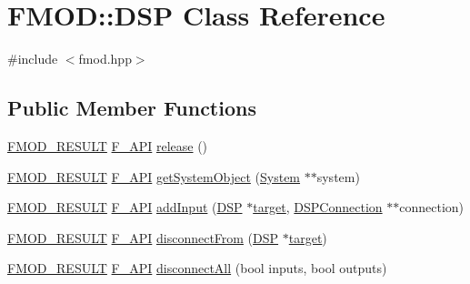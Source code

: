 \hypertarget{class_f_m_o_d_1_1_d_s_p}{\section{F\-M\-O\-D\-:\-:D\-S\-P Class Reference}
\label{class_f_m_o_d_1_1_d_s_p}
}


{\ttfamily \#include $<$fmod.\-hpp$>$}

\subsection*{Public Member Functions}
\begin{DoxyCompactItemize}
\item 
\hyperlink{fmod_8h_ae6ddadf8cb315e93ae7e6456b19db276}{F\-M\-O\-D\-\_\-\-R\-E\-S\-U\-L\-T} \hyperlink{fmod_8h_ace803d13e798b0cdde4384f9f323b901}{F\-\_\-\-A\-P\-I} \hyperlink{class_f_m_o_d_1_1_d_s_p_a4ffd9dbcf1b0119a2ab94d27744ee033}{release} ()
\item 
\hyperlink{fmod_8h_ae6ddadf8cb315e93ae7e6456b19db276}{F\-M\-O\-D\-\_\-\-R\-E\-S\-U\-L\-T} \hyperlink{fmod_8h_ace803d13e798b0cdde4384f9f323b901}{F\-\_\-\-A\-P\-I} \hyperlink{class_f_m_o_d_1_1_d_s_p_a06bef2d5b365de903e12fff814da31c7}{get\-System\-Object} (\hyperlink{class_f_m_o_d_1_1_system}{System} $\ast$$\ast$system)
\item 
\hyperlink{fmod_8h_ae6ddadf8cb315e93ae7e6456b19db276}{F\-M\-O\-D\-\_\-\-R\-E\-S\-U\-L\-T} \hyperlink{fmod_8h_ace803d13e798b0cdde4384f9f323b901}{F\-\_\-\-A\-P\-I} \hyperlink{class_f_m_o_d_1_1_d_s_p_a647ccb2fdd73ecc1ce2c9a7a5411cb8c}{add\-Input} (\hyperlink{class_f_m_o_d_1_1_d_s_p}{D\-S\-P} $\ast$\hyperlink{glew_8h_aa43eab0fe80422366a4602998d53b133}{target}, \hyperlink{class_f_m_o_d_1_1_d_s_p_connection}{D\-S\-P\-Connection} $\ast$$\ast$connection)
\item 
\hyperlink{fmod_8h_ae6ddadf8cb315e93ae7e6456b19db276}{F\-M\-O\-D\-\_\-\-R\-E\-S\-U\-L\-T} \hyperlink{fmod_8h_ace803d13e798b0cdde4384f9f323b901}{F\-\_\-\-A\-P\-I} \hyperlink{class_f_m_o_d_1_1_d_s_p_a4a7dec17c9528099e23fe92102c10c38}{disconnect\-From} (\hyperlink{class_f_m_o_d_1_1_d_s_p}{D\-S\-P} $\ast$\hyperlink{glew_8h_aa43eab0fe80422366a4602998d53b133}{target})
\item 
\hyperlink{fmod_8h_ae6ddadf8cb315e93ae7e6456b19db276}{F\-M\-O\-D\-\_\-\-R\-E\-S\-U\-L\-T} \hyperlink{fmod_8h_ace803d13e798b0cdde4384f9f323b901}{F\-\_\-\-A\-P\-I} \hyperlink{class_f_m_o_d_1_1_d_s_p_a3eb9cfc992a069357bbebeafffad9c8e}{disconnect\-All} (bool inputs, bool outputs)

\end{DoxyCompactItemize}

